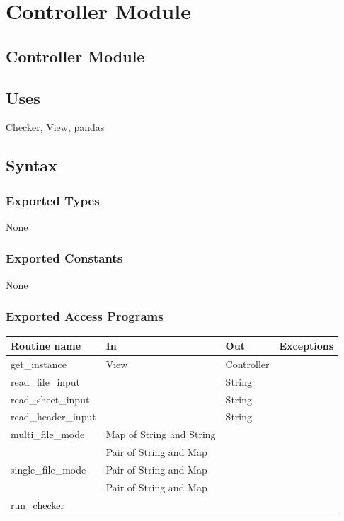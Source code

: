 \documentclass[12pt]{article}
\begin{document}
\newpage

\section* {Controller Module}

\subsection* {Controller Module}

\subsection* {Uses}

Checker, View, pandas

\subsection* {Syntax}

\subsubsection* {Exported Types}

None

\subsubsection* {Exported Constants}

None

\subsubsection* {Exported Access Programs}

\begin{tabular}{| l | l | l | p{4.7cm} |}
\hline
\textbf{Routine name} & \textbf{In} & \textbf{Out} & \textbf{Exceptions}\\
\hline
get\_instance & View & Controller & \\
\hline
read\_file\_input & & String & \\
\hline
read\_sheet\_input & & String & \\
\hline
read\_header\_input & & String & \\
\hline
multi\_file\_mode & Map of String and String & &\\
                  & Pair of String and Map &  & \\
\hline
single\_file\_mode & Pair of String and Map & &\\
                   & Pair of String and Map & & \\
\hline
run\_checker & & & \\
\hline
\end{tabular}
\end{document}
